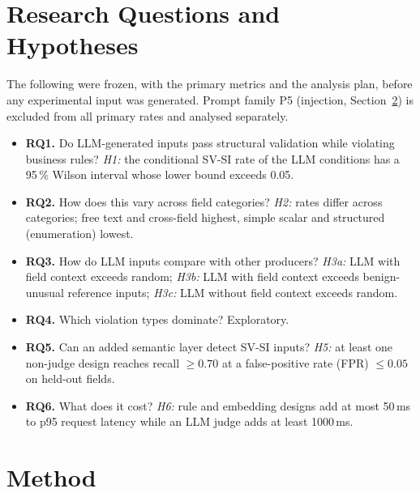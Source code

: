 \documentclass[conference]{IEEEtran}
\begin{document}
\section{Research Questions and Hypotheses}
\label{sec:rq}

The following were frozen, with the primary metrics and the analysis plan, before any experimental
input was generated. Prompt family P5 (injection, Section~\ref{sec:method}) is excluded from all
primary rates and analysed separately.

\begin{itemize}
  \item \textbf{RQ1.} Do LLM-generated inputs pass structural validation while violating business
  rules? \emph{H1:} the conditional SV-SI rate of the LLM conditions has a 95\,\% Wilson interval whose
  lower bound exceeds 0.05.
  \item \textbf{RQ2.} How does this vary across field categories? \emph{H2:} rates differ across
  categories; free text and cross-field highest, simple scalar and structured (enumeration) lowest.
  \item \textbf{RQ3.} How do LLM inputs compare with other producers? \emph{H3a:} LLM with field
  context exceeds random; \emph{H3b:} LLM with field context exceeds benign-unusual reference inputs;
  \emph{H3c:} LLM without field context exceeds random.
  \item \textbf{RQ4.} Which violation types dominate? Exploratory.
  \item \textbf{RQ5.} Can an added semantic layer detect SV-SI inputs? \emph{H5:} at least one
  non-judge design reaches recall $\geq 0.70$ at a false-positive rate (FPR) $\leq 0.05$ on held-out
  fields.
  \item \textbf{RQ6.} What does it cost? \emph{H6:} rule and embedding designs add at most 50\,ms to
  p95 request latency while an LLM judge adds at least 1000\,ms.
\end{itemize}

\section{Method}
\label{sec:method}
\end{document}

